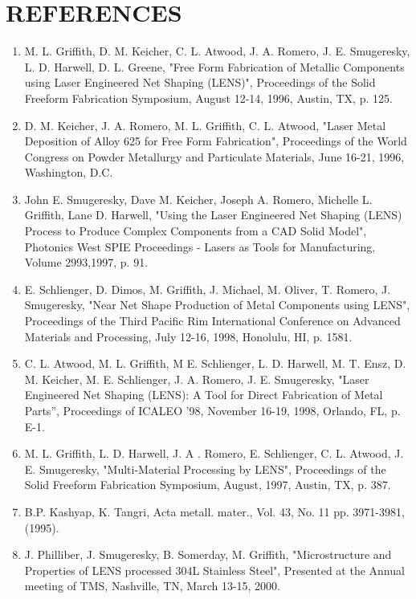 \documentclass[10pt]{article}
\begin{document}
\section*{REFERENCES}
\begin{enumerate}
  \item M. L. Griffith, D. M. Keicher, C. L. Atwood, J. A. Romero, J. E. Smugeresky, L. D. Harwell, D. L. Greene, "Free Form Fabrication of Metallic Components using Laser Engineered Net Shaping (LENS)", Proceedings of the Solid Freeform Fabrication Symposium, August 12-14, 1996, Austin, TX, p. 125.

  \item D. M. Keicher, J. A. Romero, M. L. Griffith, C. L. Atwood, "Laser Metal Deposition of Alloy 625 for Free Form Fabrication", Proceedings of the World Congress on Powder Metallurgy and Particulate Materials, June 16-21, 1996, Washington, D.C.

  \item John E. Smugeresky, Dave M. Keicher, Joseph A. Romero, Michelle L. Griffith, Lane D. Harwell, "Using the Laser Engineered Net Shaping (LENS) Process to Produce Complex Components from a CAD Solid Model", Photonics West SPIE Proceedings - Lasers as Tools for Manufacturing, Volume 2993,1997, p. 91.

  \item E. Schlienger, D. Dimos, M. Griffith, J. Michael, M. Oliver, T. Romero, J. Smugeresky, "Near Net Shape Production of Metal Components using LENS", Proceedings of the Third Pacific Rim International Conference on Advanced Materials and Processing, July 12-16, 1998, Honolulu, HI, p. 1581.

  \item C. L. Atwood, M. L. Griffith, M E. Schlienger, L. D. Harwell, M. T. Ensz, D. M. Keicher, M. E. Schlienger, J. A. Romero, J. E. Smugeresky, "Laser Engineered Net Shaping (LENS): A Tool for Direct Fabrication of Metal Parts”, Proceedings of ICALEO '98, November 16-19, 1998, Orlando, FL, p. E-1.

  \item M. L. Griffith, L. D. Harwell, J. A . Romero, E. Schlienger, C. L. Atwood, J. E. Smugeresky, "Multi-Material Processing by LENS", Proceedings of the Solid Freeform Fabrication Symposium, August, 1997, Austin, TX, p. 387.

  \item B.P. Kashyap, K. Tangri, Acta metall. mater., Vol. 43, No. 11 pp. 3971-3981, (1995).

  \item J. Philliber, J. Smugeresky, B. Somerday, M. Griffith, "Microstructure and Properties of LENS processed 304L Stainless Steel", Presented at the Annual meeting of TMS, Nashville, TN, March 13-15, 2000.


\end{enumerate}
\end{document}
